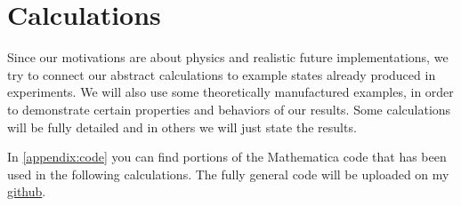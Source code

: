 \documentclass[a4paper,12pt]{book}
\begin{document}
\chapter{Calculations}
Since our motivations are about physics and realistic future implementations, we try to connect our abstract calculations to 
example states already produced in experiments. We will also use some theoretically manufactured examples, in order to demonstrate certain properties and behaviors of our results. Some calculations will be fully detailed and in others we will just state the results.
\par 
In \ref{appendix:code} you can find portions of the Mathematica code that has been used in the following calculations. The fully general code will be uploaded on my  \href{https://github.com/jmstf94}{github}.










\end{document}

